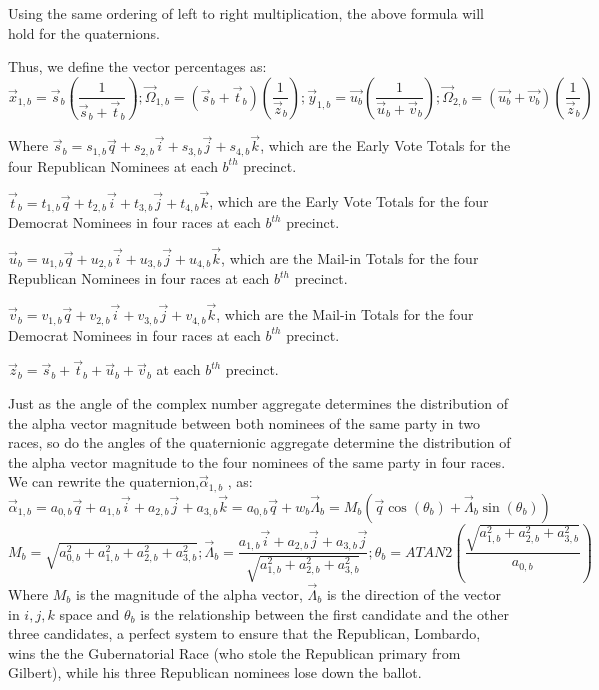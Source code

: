 \documentclass[preprint,13pt]{elsarticle}
\begin{document}
Using the same ordering of left to right multiplication, the above formula will hold for the quaternions. 

Thus, we define the vector percentages as:
$$\vec{x}_{1,b}=\vec{s}_{b}\left(\frac{1}{\vec{s}_{b}+\vec{t}_{b}}\right); \vec{\Omega}_{1,b}=\left(\vec{s}_{b}+\vec{t}_{b}\right)\left(\frac{1}{\vec{z}_{b}}\right); \vec{y}_{1,b}=\vec{u_{b}}\left(\frac{1}{\vec{u}_{b}+\vec{v}_{b}}\right); \vec{\Omega}_{2,b}=\left(\vec{u_{b}}+\vec{v_{b}}\right)\left(\frac{1}{\vec{z}_{b}}\right)$$

Where $\vec{s}_{b}=s_{1,b}\vec{q}+s_{2,b}\vec{i}+s_{3,b}\vec{j}+s_{4,b}\vec{k}$, which are the Early Vote Totals for the four Republican Nominees at each $b^{th}$ precinct.

$\vec{t}_{b}=t_{1,b}\vec{q}+t_{2,b}\vec{i}+t_{3,b}\vec{j}+t_{4,b}\vec{k}$, which are the Early Vote Totals for the four Democrat Nominees in four races at each $b^{th}$ precinct.

$\vec{u}_{b}=u_{1,b}\vec{q}+u_{2,b}\vec{i}+u_{3,b}\vec{j}+u_{4,b}\vec{k}$, which are the Mail-in Totals for the four Republican Nominees in four races at each $b^{th}$ precinct.

$\vec{v}_{b}=v_{1,b}\vec{q}+v_{2,b}\vec{i}+v_{3,b}\vec{j}+v_{4,b}\vec{k}$, which are the Mail-in Totals for the four Democrat Nominees in four races at each $b^{th}$ precinct.

$\vec{z}_{b}=\vec{s}_{b}+\vec{t}_{b}+\vec{u}_{b}+\vec{v}_{b}$ at each $b^{th}$ precinct.

Just as the angle of the complex number aggregate determines the distribution of the alpha vector magnitude between both nominees of the same party in two races, so do the angles of the quaternionic aggregate determine the distribution of the alpha vector magnitude to the four nominees of the same party in four races.
\newpage
We can rewrite the quaternion,$\vec{\alpha}_{1,b}$ , as:
$$\vec{\alpha}_{1,b}=a_{0,b}\vec{q}+a_{1,b}\vec{i}+a_{2,b}\vec{j}+a_{3,b}\vec{k}=a_{0,b}\vec{q}+w_{b}\vec{\Lambda}_{b}=M_b\left(\vec{q}\cos(\theta_b)+\vec{\Lambda}_{b}\sin(\theta_b)\right)$$
$$M_{b}=\sqrt{a_{0,b}^2+a_{1,b}^2+a_{2,b}^2+a_{3,b}^2}; \vec{\Lambda}_{b}=\frac{a_{1,b}\vec{i}+a_{2,b}\vec{j}+a_{3,b}\vec{j}}{\sqrt{a_{1,b}^2+a_{2,b}^2+a_{3,b}^2}}; \theta_{b}=ATAN2\left(\frac{\sqrt{a_{1,b}^2+a_{2,b}^2+a_{3,b}^2}}{a_{0,b}}\right )$$
Where $M_{b}$ is the magnitude of the alpha vector, $\vec{\Lambda}_{b}$ is the direction of the vector in $i,j,k$ space and $\theta_{b}$ is the relationship between the first candidate and the other three candidates, a perfect system to ensure that the Republican, Lombardo, wins the the Gubernatorial Race (who stole the Republican primary from Gilbert), while his three Republican nominees lose down the ballot.
\end{document}
